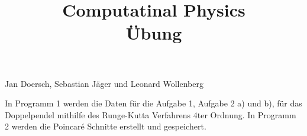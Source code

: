 \documentclass[a4paper, 12pt]{article}
\begin{document}
\title{
\textbf{Computatinal Physics\\
Übung}
}
\date{}
\maketitle

\begin{center}
Jan Doersch, Sebastian Jäger und Leonard Wollenberg
\end{center}
In Programm 1 werden die Daten für die Aufgabe 1, Aufgabe 2 a) und b), für das Doppelpendel mithilfe des Runge-Kutta Verfahrens 4ter Ordnung.
In Programm 2 werden die Poincaré Schnitte erstellt und gespeichert.


\newpage

\end{document}
